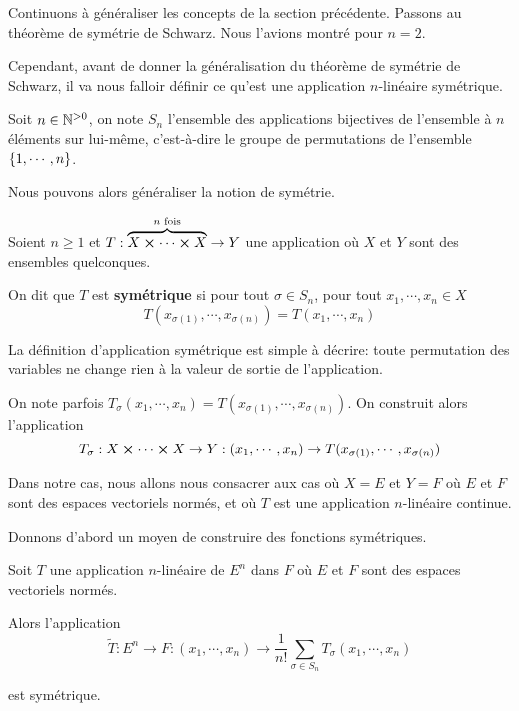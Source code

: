Continuons à généraliser les concepts de la section précédente. Passons au
théorème de symétrie de Schwarz. Nous l'avions montré pour $n = 2$.

Cependant, avant de donner la généralisation du théorème de symétrie de Schwarz,
il va nous falloir définir ce qu'est une application $n$-linéaire symétrique.

\begin{definition}
	Soit $n \in \mathbb{N}^{> 0}$, on note $S_{n}$ l'ensemble des applications
	bijectives de l'ensemble à $n$ éléments sur lui-même, c'est-à-dire le groupe
	de permutations de l'ensemble $\left\{ 1, \cdots, n \right\}$.
\end{definition}

Nous pouvons alors généraliser la notion de symétrie.

\begin{definition} 
	Soient $n \geq 1$ et $T : \overbrace{X \cross \cdots \cross X}^{n
	\text{ fois}} \rightarrow Y$ une application où $X$ et $Y$ sont des
	ensembles quelconques.

	On dit que $T$ est \textbf{symétrique} si
	pour tout $\sigma \in S_{n}$, pour tout $x_{1}, \cdots, x_{n} \in X$
	\begin{equation*}
		T(x_{\sigma(1)}, \cdots, x_{\sigma(n)}) = T(x_{1}, \cdots, x_{n})
	\end{equation*}
\end{definition}

La définition d'application symétrique est simple à décrire: toute permutation
des variables ne change rien à la valeur de sortie de l'application.

\begin{remarque}
	On note parfois $T_{\sigma} (x_{1}, \cdots, x_{n}) = T(x_{\sigma(1)},
	\cdots, x_{\sigma(n)})$. On construit alors l'application
	\begin{equation*}
		T_{\sigma} : X \cross \cdots \cross X \rightarrow Y : (x_{1},
		\cdots, x_{n}) \rightarrow T(x_{\sigma(1)}, \cdots, x_{\sigma(n)})
	\end{equation*}
\end{remarque}

Dans notre cas, nous allons nous consacrer aux cas où $X = E$ et $Y = F$ où $E$
et $F$ sont des espaces vectoriels normés, et où $T$ est une application $n$-linéaire continue.

Donnons d'abord un moyen de construire des fonctions symétriques.

\begin{proposition}
	Soit $T$ une application $n$-linéaire de $E^{n}$
	dans $F$ où $E$ et $F$ sont des espaces vectoriels normés.

	Alors l'application
	\begin{equation*}
		\tilde{T} : E^{n} \rightarrow F : (x_{1},
		\cdots, x_{n}) \rightarrow \frac{1}{n !} \sum_{\sigma \in S_{n}}
		T_{\sigma} (x_{1}, \cdots, x_{n})
	\end{equation*}

	est symétrique.
\end{proposition}

